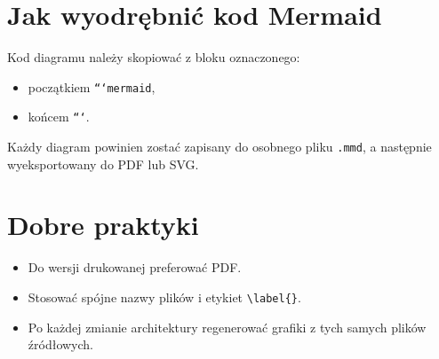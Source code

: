 \section{Jak wyodrębnić kod Mermaid}
Kod diagramu należy skopiować z bloku oznaczonego:
\begin{itemize}
    \item początkiem \texttt{```mermaid},
    \item końcem \texttt{```}.
\end{itemize}

Każdy diagram powinien zostać zapisany do osobnego pliku \texttt{.mmd}, a następnie wyeksportowany do PDF lub SVG.

\section{Dobre praktyki}
\begin{itemize}
    \item Do wersji drukowanej preferować PDF.
    \item Stosować spójne nazwy plików i etykiet \texttt{\textbackslash label\{\}}.
    \item Po każdej zmianie architektury regenerować grafiki z tych samych plików źródłowych.
\end{itemize}